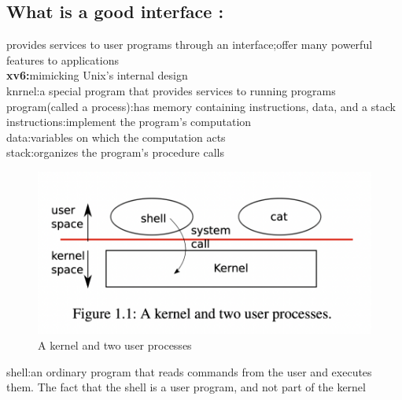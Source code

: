 \documentclass{thuemp}
\begin{document}
\subsection*{What is a good interface :} provides services to user programs through an interface;offer many powerful features to applications\\
\textbf{xv6:}mimicking Unix's internal design\\
knrnel:a special program that provides services to running programs\\
program(called a process):has memory containing instructions, data, and a stack\\
instructions:implement the program’s computation\\
data:variables on which the computation acts\\
stack:organizes the program’s procedure calls
\begin{figure}[H]
	\centering
	\includegraphics[width=0.8\linewidth]{./image/1.1.png}
	\caption{A kernel and two user processes} 
	\label{png:1.1}
\end{figure}
shell:an ordinary program that reads commands 
from the user and executes them.
The fact that the shell is a user program, 
and not part of the kernel

















\newpage









\renewcommand\refname{\heiti\wuhao\centerline{参考文献}\global\def\refname{参考文献}}
\vskip 12pt

\let\OLDthebibliography\thebibliography
\renewcommand\thebibliography[1]{
  \OLDthebibliography{#1}
  \setlength{\parskip}{0pt}
  \setlength{\itemsep}{0pt plus 0.3ex}
}

{
\renewcommand{\baselinestretch}{0.9}
\liuhao


}
\end{document}
